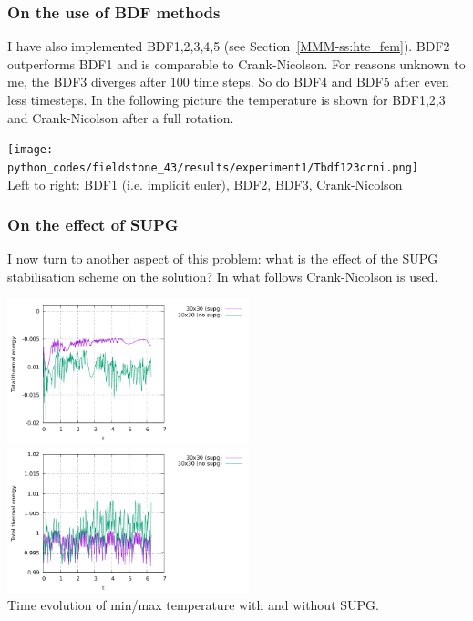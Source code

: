 \subsubsection*{On the use of BDF methods} I have also implemented 
BDF1,2,3,4,5  (see Section~\ref{MMM-ss:hte_fem}). 
BDF2 outperforms BDF1 and is comparable to Crank-Nicolson. 
For reasons unknown to me, the BDF3 diverges after 100 time steps. So do 
BDF4 and BDF5 after even less timesteps. In the following picture the temperature is shown for 
BDF1,2,3 and Crank-Nicolson after a full rotation.

\begin{center}
\texttt{[image: python\_codes/fieldstone\_43/results/experiment1/Tbdf123crni.png]}\\
{\captionfont Left to right: BDF1 (i.e. implicit euler), BDF2, BDF3, Crank-Nicolson}
\end{center}



\subsubsection*{On the effect of SUPG} 
I now turn to another aspect of this problem: what is the effect of the SUPG stabilisation 
scheme on the solution? In what follows Crank-Nicolson is used. 

\begin{center}
\includegraphics[width=7cm]{python_codes/fieldstone_43/results/experiment1/Tmin_supg}
\includegraphics[width=7cm]{python_codes/fieldstone_43/results/experiment1/Tmax_supg}\\
{\captionfont Time evolution of min/max temperature with and without SUPG.} 
\end{center}

